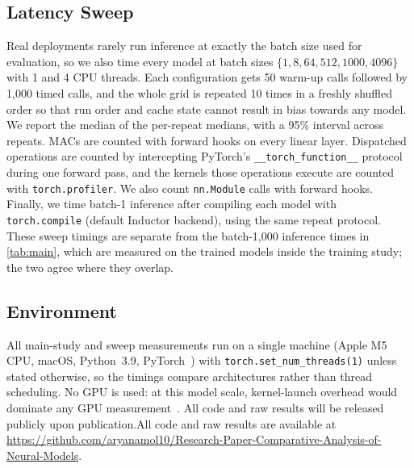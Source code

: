 \subsection{Latency Sweep}
\label{sec:sweep}
Real deployments rarely run inference at exactly the batch size used for evaluation, so we also time every
model at batch sizes $\{1, 8, 64, 512, 1000, 4096\}$ with 1 and 4 CPU threads. Each configuration
gets 50 warm-up calls followed by 1,000 timed calls, and the whole grid is repeated 10 times in a freshly shuffled
order so that run order and cache state cannot result in bias towards any model. We report the median of the per-repeat medians,
with a 95\% interval across repeats.
MACs are counted with forward hooks on every linear layer. Dispatched operations are counted by intercepting
PyTorch's \texttt{\_\_torch\_function\_\_} protocol during one forward pass, and the kernels those operations
execute are counted with \texttt{torch.profiler}. We also count \texttt{nn.Module} calls with forward
hooks. Finally, we time batch-1 inference after compiling each model with \texttt{torch.compile} (default
Inductor backend), using the same repeat protocol. These sweep timings are separate from the batch-1,000 inference
times in \cref{tab:main}, which are measured on the trained models inside the training study; the two agree where
they overlap.

\subsection{Environment}
All main-study and sweep measurements run on a single machine (Apple M5 CPU, macOS, Python~3.9,
PyTorch~\torchVersion) with \texttt{torch.set\_num\_threads(1)} unless stated otherwise, so the timings
compare architectures rather than thread scheduling. No GPU is used: at this model scale, kernel-launch
overhead would dominate any GPU measurement~\cite{sze2017efficient}. \ifanonymous All code and raw results will be released publicly upon
publication.\else All code and raw results are available at
\url{https://github.com/aryanamol10/Research-Paper-Comparative-Analysis-of-Neural-Models}.\fi
